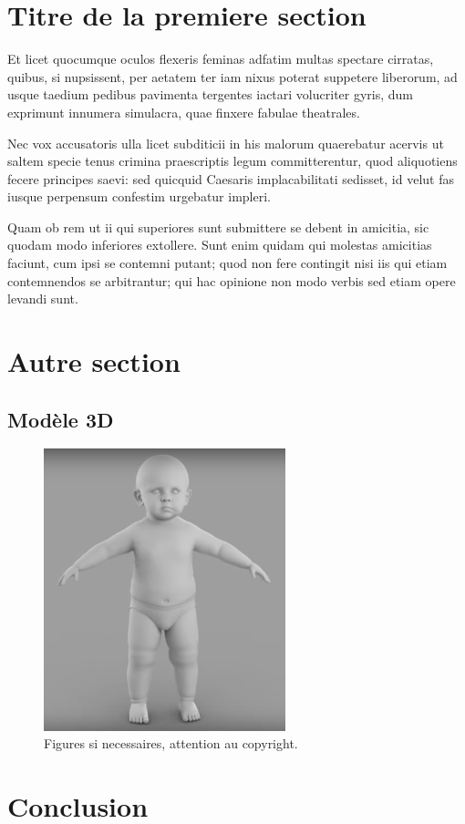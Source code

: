 \documentclass{inf2164}
\begin{document}
\section{Titre de la premiere section}
\label{sec:animation}

Et licet quocumque oculos flexeris feminas adfatim multas spectare cirratas, quibus, si nupsissent, per aetatem ter iam nixus poterat suppetere liberorum, ad usque taedium pedibus pavimenta tergentes iactari volucriter gyris, dum exprimunt innumera simulacra, quae finxere fabulae theatrales.

Nec vox accusatoris ulla licet subditicii in his malorum quaerebatur acervis ut saltem specie tenus crimina praescriptis legum committerentur, quod aliquotiens fecere principes saevi: sed quicquid Caesaris implacabilitati sedisset, id velut fas iusque perpensum confestim urgebatur impleri.

Quam ob rem ut ii qui superiores sunt submittere se debent in amicitia, sic quodam modo inferiores extollere. Sunt enim quidam qui molestas amicitias faciunt, cum ipsi se contemni putant; quod non fere contingit nisi iis qui etiam contemnendos se arbitrantur; qui hac opinione non modo verbis sed etiam opere levandi sunt.


\section{Autre section}
\subsection{Mod\`ele 3D}

\begin{figure}[htb]
  \centering
  \includegraphics[width=7cm]{./bb1.png}
  \caption{\label{fig:bb1}
         Figures si necessaires, attention au copyright.}
\end{figure}




\section{Conclusion}




\end{document}
